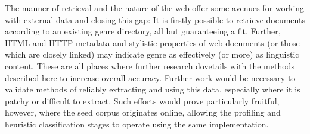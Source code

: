 The manner of retrieval and the nature of the web offer some avenues for working with external data and closing this gap: It is firstly possible to retrieve documents according to an existing genre directory, all but guaranteeing a fit.  Further, HTML and HTTP metadata and stylistic properties of web documents (or those which are closely linked) may indicate genre as effectively (or more) as linguistic content.  These are all places where further research dovetails with the methods described here to increase overall accuracy.  Further work would be necessary to validate methods of reliably extracting and using this data, especially where it is patchy or difficult to extract.  Such efforts would prove particularly fruitful, however, where the seed corpus originates online, allowing the profiling and heuristic classification stages to operate using the same implementation.







